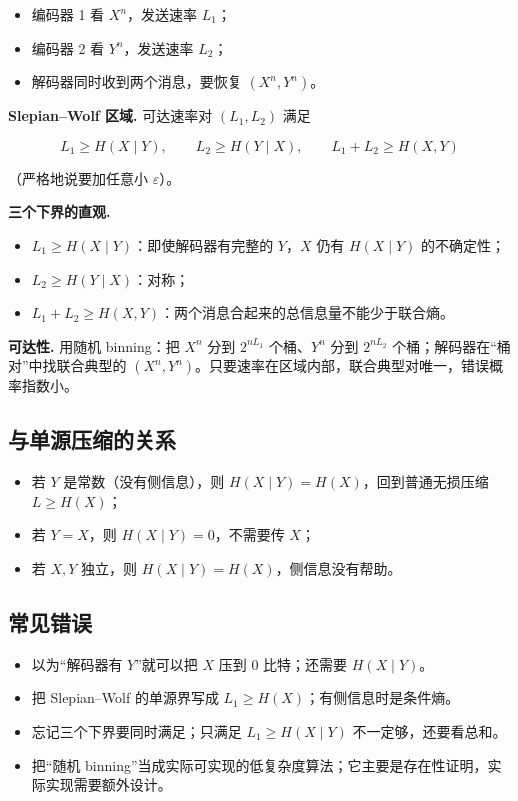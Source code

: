 \begin{itemize}
\item 编码器 1 看 $X^n$，发送速率 $L_1$；
\item 编码器 2 看 $Y^n$，发送速率 $L_2$；
\item 解码器同时收到两个消息，要恢复 $(X^n,Y^n)$。
\end{itemize}


\textbf{Slepian–Wolf 区域.} 可达速率对 $(L_1,L_2)$ 满足

\[
\boxed{
L_1\ge H(X\mid Y),\qquad
L_2\ge H(Y\mid X),\qquad
L_1+L_2\ge H(X,Y)
}
\]

（严格地说要加任意小 $\varepsilon$）。

\textbf{三个下界的直观.}

\begin{itemize}
\item $L_1\ge H(X\mid Y)$：即使解码器有完整的 $Y$，$X$ 仍有 $H(X\mid Y)$ 的不确定性；
\item $L_2\ge H(Y\mid X)$：对称；
\item $L_1+L_2\ge H(X,Y)$：两个消息合起来的总信息量不能少于联合熵。
\end{itemize}


\textbf{可达性.} 用随机 binning：把 $X^n$ 分到 $2^{nL_1}$ 个桶、$Y^n$ 分到 $2^{nL_2}$ 个桶；解码器在“桶对”中找联合典型的 $(X^n,Y^n)$。只要速率在区域内部，联合典型对唯一，错误概率指数小。

\subsection{与单源压缩的关系}


\begin{itemize}
\item 若 $Y$ 是常数（没有侧信息），则 $H(X\mid Y)=H(X)$，回到普通无损压缩 $L\ge H(X)$；
\item 若 $Y=X$，则 $H(X\mid Y)=0$，不需要传 $X$；
\item 若 $X,Y$ 独立，则 $H(X\mid Y)=H(X)$，侧信息没有帮助。
\end{itemize}


\subsection{常见错误}


\begin{itemize}
\item 以为“解码器有 $Y$”就可以把 $X$ 压到 $0$ 比特；还需要 $H(X\mid Y)$。
\item 把 Slepian–Wolf 的单源界写成 $L_1\ge H(X)$；有侧信息时是条件熵。
\item 忘记三个下界要同时满足；只满足 $L_1\ge H(X\mid Y)$ 不一定够，还要看总和。
\item 把“随机 binning”当成实际可实现的低复杂度算法；它主要是存在性证明，实际实现需要额外设计。
\end{itemize}
